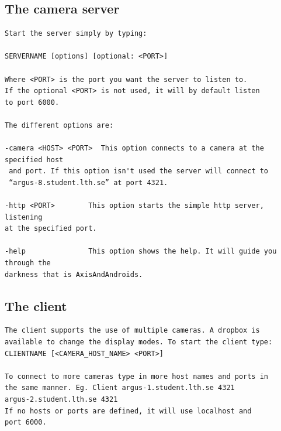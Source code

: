 \documentclass[8pt,titlepage]{article}
\begin{document}
\subsection{The camera server}
\begin{verbatim}
Start the server simply by typing:

SERVERNAME [options] [optional: <PORT>]

Where <PORT> is the port you want the server to listen to. 
If the optional <PORT> is not used, it will by default listen 
to port 6000.

The different options are:

-camera <HOST> <PORT>  This option connects to a camera at the 
specified host
 and port. If this option isn't used the server will connect to 
 “argus-8.student.lth.se” at port 4321.

-http <PORT> 		This option starts the simple http server, listening 
at the specified port.

-help 				This option shows the help. It will guide you through the 
darkness that is AxisAndAndroids.
\end{verbatim}

\subsection{The client}
\begin{verbatim}
The client supports the use of multiple cameras. A dropbox is 
available to change the display modes. To start the client type:
CLIENTNAME [<CAMERA_HOST_NAME> <PORT>]

To connect to more cameras type in more host names and ports in 
the same manner. Eg. Client argus-1.student.lth.se 4321 
argus-2.student.lth.se 4321
If no hosts or ports are defined, it will use localhost and 
port 6000.
\end{verbatim}
\end{document}

